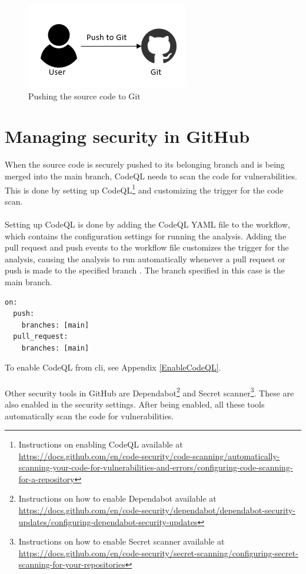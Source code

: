 \vspace{2mm}
\begin{figure}[H]
    \centering
    \includegraphics[width=0.5\columnwidth]{Images/aws-piplin-1.png}
    \caption{Pushing the source code to Git}
    \label{fig: Pushing the source code to Git}
\end{figure}


\section{Managing security in GitHub}
When the source code is securely pushed to its belonging branch and is being merged into the main branch, CodeQL needs to scan the code for vulnerabilities. This is done by setting up CodeQL\footnote{Instructions on enabling CodeQL available at \url{https://docs.github.com/en/code-security/code-scanning/automatically-scanning-your-code-for-vulnerabilities-and-errors/configuring-code-scanning-for-a-repository}} and customizing the trigger for the code scan. 
\\~\\
Setting up CodeQL is done by adding the CodeQL YAML file to the workflow, which contains the configuration settings for running the analysis. Adding the pull request and push events to the workflow file customizes the trigger for the analysis, causing the analysis to run automatically whenever a pull request or push is made to the specified branch \cite{CodeQLCustom}. The branch specified in this case is the main branch. 

\vspace{2mm}
\begin{lstlisting}[language=terraform, caption=Custom trigger for CodeQL alerts, captionpos=b, frame=single]
on:
  push:
    branches: [main]
  pull_request:
    branches: [main]
\end{lstlisting}

To enable CodeQL from \acrshort{cli}, see Appendix \ref{EnableCodeQL}.
\\~\\
Other security tools in GitHub are Dependabot\footnote{Instructions on how to enable Dependabot available at \url{https://docs.github.com/en/code-security/dependabot/dependabot-security-updates/configuring-dependabot-security-updates}} and Secret scanner\footnote{Instructions on how to enable Secret scanner available at \url{https://docs.github.com/en/code-security/secret-scanning/configuring-secret-scanning-for-your-repositories}}. These are also enabled in the security settings. After being enabled, all these tools automatically scan the code for vulnerabilities.

